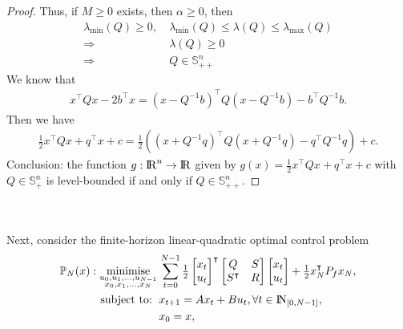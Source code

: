 \documentclass[a4paper,11pt,reqno]{amsart}
\newcommand{\R}{{\rm I\!R}}
\newcommand{\N}{{\rm I\!N}}
\newcommand{\tran}{\intercal}
\DeclareMathOperator*{\minimise}{minimise}
\begin{document}
\begin{proof}
Thus, if $M\geq 0$ exists, then $\alpha\geq 0$, then
\begin{align}
    \lambda_{\mathrm{min}}(Q)\geq 0,\ &\lambda_{\mathrm{min}}(Q)\leq\lambda(Q)\leq\lambda_{\mathrm{max}}(Q)\\
    \Longrightarrow&\lambda(Q)\geq 0\\
    \Longrightarrow &Q\in \mathbb{S}^n_{++}
\end{align}
We know that
\begin{align}
    x^{\tran}Qx-2b^{\tran}x=(x-Q^{-1}b)^{\tran}Q(x-Q^{-1}b)-b^{\tran}Q^{-1}b.
\end{align}
Then we have
\begin{align}
    \tfrac{1}{2}x^{\tran}Qx+q^{\tran}x+c=\tfrac{1}{2}\left( (x+Q^{-1}q)^{\tran}Q(x+Q^{-1}q)-q^{\tran}Q^{-1}q \right)+c .
\end{align}
Conclusion: the function $g:\R^n\to \R$ given by $g(x) = \frac{1}{2}x^{\tran}Qx+q^{\tran}x+c$ with $Q\in \mathbb{S}^n_+$ is level-bounded
if and only if $Q\in \mathbb{S}^n_{++}$.
\end{proof}
\
\\ \\
Next, consider the finite-horizon linear-quadratic optimal control problem
\begin{subequations}
    \begin{align}
        \mathbb{P}_N(x): \minimise_{\substack{u_0,u_1,\ldots,u_{N-1}\\ x_0,x_1,\ldots,x_N}} \,
         & \sum_{t=0}^{N-1}\textstyle\frac{1}{2}
         \begin{bmatrix}
             x_t\\
             u_t
         \end{bmatrix}^{\tran}
         \begin{bmatrix}
             Q&S\\
             S^{\tran}&R
         \end{bmatrix}
         \begin{bmatrix}
             x_t\\
             u_t
         \end{bmatrix}
         +\frac{1}{2}x_N^{\tran}P_fx_N,
        \\
        \text{subject to: }\,
         & x_{t+1} = A x_t + B u_t, \forall t\in\N_{[0, N-1]},
        \\
         & x_{0} = x,
    \end{align}
\end{subequations}
\end{document}
